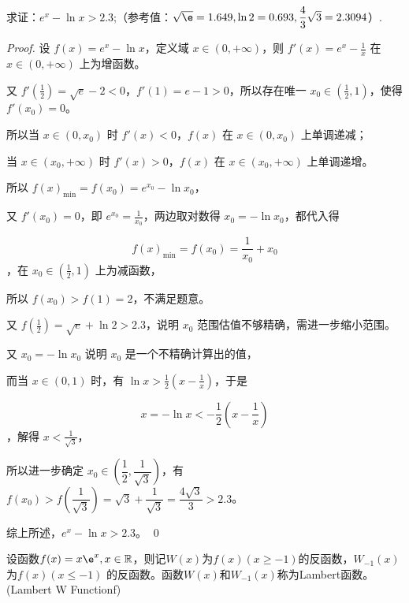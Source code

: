 \begin{example}
    求证：\(e^x-\ln x >2.3\);（参考值：\(\sqrt{\e}=1.649,\ln 2=0.693,\dfrac{4}{3}\sqrt{3}=2.3094\)）.
\end{example}

\begin{proof}
    设 $f(x) = e^x - \ln x$，定义域 $x \in (0, +\infty)$，则 $f'(x) = e^x - \frac{1}{x}$ 在 $x \in (0, +\infty)$ 上为增函数。

又 $f'\left(\frac{1}{2}\right) = \sqrt{e} - 2 < 0$，$f'(1) = e - 1 > 0$，所以存在唯一 $x_0 \in \left(\frac{1}{2}, 1\right)$，使得 $f'(x_0) = 0$。

所以当 $x \in (0, x_0)$ 时 $f'(x) < 0$，$f(x)$ 在 $x \in (0, x_0)$ 上单调递减；

当 $x \in (x_0, +\infty)$ 时 $f'(x) > 0$，$f(x)$ 在 $x \in (x_0, +\infty)$ 上单调递增。

所以 $f(x)_{\min} = f(x_0) = e^{x_0} - \ln x_0$，

又 $f'(x_0) = 0$，即 $e^{x_0} = \frac{1}{x_0}$，两边取对数得 $x_0 = -\ln x_0$，都代入得

\[ f(x)_{\min} = f(x_0) = \frac{1}{x_0} + x_0 \]，在 $x_0 \in \left(\frac{1}{2}, 1\right)$ 上为减函数，

所以 $f(x_0) > f(1) = 2$，不满足题意。

又 $f\left(\frac{1}{2}\right) = \sqrt{e} + \ln 2 > 2.3$，说明 $x_0$ 范围估值不够精确，需进一步缩小范围。

又 $x_0 = -\ln x_0$ 说明 $x_0$ 是一个不精确计算出的值，

而当 $x \in (0, 1)$ 时，有 $\ln x > \frac{1}{2}(x - \frac{1}{x})$，于是

\[ x = -\ln x < -\frac{1}{2}(x - \frac{1}{x}) \]，解得 $x < \frac{1}{\sqrt{3}}$，

所以进一步确定 $x_0 \in \left(\dfrac{1}{2}, \dfrac{1}{\sqrt{3}}\right)$，有 $f(x_0) > f\left(\dfrac{1}{\sqrt{3}}\right) = \sqrt{3} + \dfrac{1}{\sqrt{3}} = \dfrac{4\sqrt{3}}{3} > 2.3$。

综上所述，$e^x - \ln x > 2.3$。
\qed
\end{proof}

\begin{definition}
    设函数\(f(x)=x\e ^x,x\in\mathbb{R}\)，则记\(W(x)\)为\(f(x)(x\geq -1)\)的反函数，\(W_{-1}(x)\)为\(f(x)(x\leq -1)\)
    的反函数。函数\(W(x)\)和\(W_{-1}(x)\)称为Lambert函数。(Lambert W Functionf)
\end{definition}
















